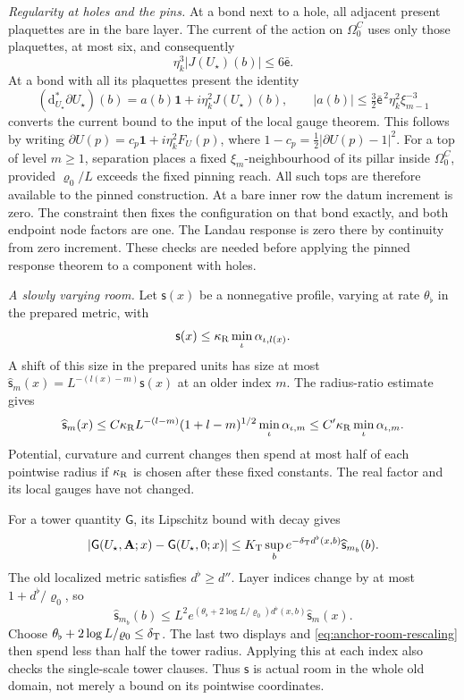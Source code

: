 \documentclass[11pt,letterpaper,reqno]{amsart}
\theoremstyle{definition}
\theoremstyle{remark}
\begin{document}
\emph{Regularity at holes and the pins.}
At a bond next to a hole, all adjacent present plaquettes
are in the bare layer. The current of the action on
\(\Omega^C_0\) uses only those plaquettes, at most six,
and consequently
\[
 \eta_k^3|J(U_\star)(b)|\le6\bar{\mathsf e}.
\]
At a bond with all its plaquettes present the identity
\[
 (\mathrm d^*_{U_\star}\partial U_\star)(b)
     =a(b)\mathbf1+i\eta_k^2J(U_\star)(b),\qquad
 |a(b)|\le\tfrac32\bar{\mathsf e}^{\,2}
                                 \eta_k^2\xi_{m-1}^{-3}
\]
converts the current bound to the input of the local
gauge theorem. This follows by writing
\(\partial U(p)=c_p\mathbf1+i\eta_k^2F_U(p)\),
where \(1-c_p=\tfrac12|\partial U(p)-1|^2\).
For a top of level \(m\ge1\), separation places a fixed
\(\xi_m\)-neighbourhood of its pillar inside
\(\Omega^C_0\), provided \(\varrho_0/L\) exceeds the
fixed pinning reach. All such tops are therefore
available to the pinned construction. At a bare
inner row the datum increment is zero. The constraint
then fixes the configuration on that bond exactly,
and both endpoint node factors are one. The Landau
response is zero there by continuity from zero
increment. These checks are needed before applying
the pinned response theorem to a component with holes.

\emph{A slowly varying room.}
Let \(\mathsf s(x)\) be a nonnegative profile, varying
at rate \(\theta_\flat\) in the prepared metric, with
\[
 \mathsf s(x)\le
       \kappa_{\rm R}\min_\iota\alpha_{\iota,l(x)}.
\]
A shift of this size in the prepared units has size at
most
\(\widehat{\mathsf s}_m(x)=L^{-(l(x)-m)}\mathsf s(x)\)
at an older index \(m\). The radius-ratio estimate gives
\begin{equation}\label{eq:anchor-room-rescaling}
 \widehat{\mathsf s}_m(x)
 \le C\kappa_{\rm R}L^{-(l-m)}(1+l-m)^{1/2}
                            \min_\iota\alpha_{\iota,m}
 \le C'\kappa_{\rm R}\min_\iota\alpha_{\iota,m}.
\end{equation}
Potential, curvature and current changes then spend
at most half of each pointwise radius if
\(\kappa_{\rm R}\) is chosen after these fixed constants.
The real factor and its local gauges have not changed.

For a tower quantity \(\mathsf G\), its Lipschitz bound
with decay gives
\[
 |\mathsf G(U_\star,\mathbf A;x)
                    -\mathsf G(U_\star,0;x)|
 \le K_{\rm T}\sup_b
       e^{-\delta_{\rm T}d^\flat(x,b)}
                           \widehat{\mathsf s}_{m_b}(b).
\]
The old localized metric satisfies \(d^\flat\ge d''\).
Layer indices change by at most
\(1+d^\flat/\varrho_0\), so
\[
 \widehat{\mathsf s}_{m_b}(b)
 \le L^2e^{(\theta_\flat+2\log L/\varrho_0)d^\flat(x,b)}
                                      \widehat{\mathsf s}_m(x).
\]
Choose
\(\theta_\flat+2\log L/\varrho_0\le\delta_{\rm T}\).
The last two displays and
\eqref{eq:anchor-room-rescaling} then spend less than
half the tower radius. Applying this at each index
also checks the single-scale tower clauses.
Thus \(\mathsf s\) is actual room in the whole old
domain, not merely a bound on its pointwise coordinates.
\end{document}
